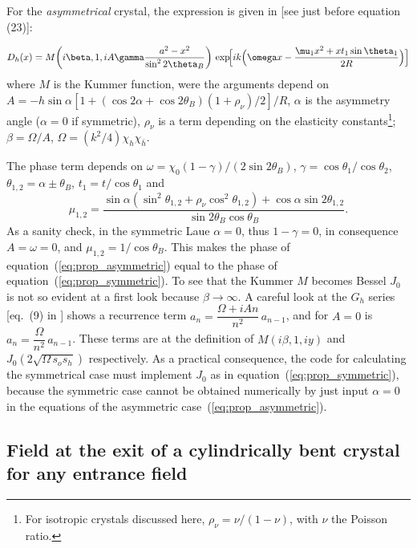 \documentclass[preprint]{iucr}              %
\begin{document}
For the {\it asymmetrical} crystal, the expression is given in \cite{GuigayFerrero2016} [see just before equation (23)]: 

\begin{equation}\label{eq:prop_asymmetric}
D_h(x) =
M\!\left( i \beta, 1, i A \gamma \frac{a^2 - x^2}{\sin^2 2\theta_B}
\right)\,
\exp\!\Bigl[i k 
\Bigl(\omega x -
\frac{\mu_1 x^2 + x t_1 \sin\theta_1}{2 R}
\Bigr)\Bigr]
\end{equation}
where
$M$ is the Kummer function, were the arguments depend on
$A=-h \sin\alpha [1 + (\cos 2\alpha + \cos 2 \theta_B)(1+\rho_\nu)/2]/R$,
$\alpha$ is the asymmetry angle ($\alpha=0$ if symmetric),
$\rho_\nu$ is a term depending on the elasticity constants\footnote{For isotropic crystals discussed here, $\rho_\nu=\nu/(1-\nu)$, with $\nu$ the Poisson ratio.};
$\beta=\Omega/A$, 
$\Omega=(k^2/4) \chi_h \chi_{\bar{h}}$.

The phase term depends on
$\omega=\chi_0(1-\gamma)/(2 \sin 2 \theta_B)$, 
$\gamma=\cos \theta_1 / \cos \theta_2$,
$\theta_{1,2}=\alpha \pm \theta_B$, $t_1=t/\cos \theta_1$ and 
\begin{equation}
    \mu_{1,2}=\frac
{\sin\alpha (\sin^2\theta_{1,2} + \rho_\nu \cos^2\theta_{1,2})+\cos\alpha \sin 2\theta_{1,2}}
{\sin 2 \theta_B \cos \theta_B}. \nonumber
\end{equation}
As a sanity check, in the symmetric Laue $\alpha=0$, thus $1-\gamma=0$, in consequence $A=\omega=0$, and $\mu_{1,2}=1/\cos \theta_B$. This makes the phase of equation~(\ref{eq:prop_asymmetric}) equal to the phase of equation~(\ref{eq:prop_symmetric}). 
To see that the Kummer $M$ becomes Bessel $J_0$ is not so evident at a first look because $\beta \rightarrow \infty$. A careful look at the $G_h$ series [eq.~(9) in \cite{GuigayFerrero2016}] shows a recurrence term $a_n = \dfrac{\Omega + i A n}{n^2}\,a_{n-1}$, and for $A=0$ is $a_n = \dfrac{\Omega}{n^2}\,a_{n-1}$. These terms are at the definition of $M(i\beta, 1, iy)$ and $J_0\!\left(2\sqrt{\Omega\, s_o s_h}\right)$ respectively.
As a practical consequence, the code for calculating the symmetrical case must implement $J_0$ as in equation~(\ref{eq:prop_symmetric}), because the symmetric case cannot be obtained numerically by just input $\alpha=0$ in the equations of the asymmetric case~(\ref{eq:prop_asymmetric}).

%
\subsection{Field at the exit of a cylindrically bent crystal for any entrance field}\label{sec:anytopoint}
\end{document}
